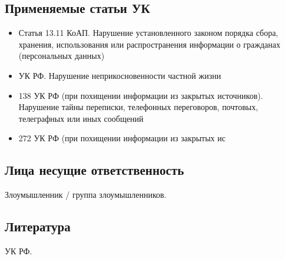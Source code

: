 \subsection*{Применяемые статьи УК}
\begin{itemize}
  \item Статья 13.11 КоАП. Нарушение установленного законом порядка сбора,
    хранения, использования или распространения информации о гражданах
    (персональных данных)
  \item УК РФ. Нарушение неприкосновенности частной жизни
  \item 138 УК РФ (при похищении информации из закрытых источников).  Нарушение
    тайны переписки, телефонных переговоров, почтовых, телеграфных или иных
    сообщений
  \item 272 УК РФ (при похищении информации из закрытых ис
\end{itemize}

\subsection*{Лица несущие ответственность}
Злоумышленник / группа злоумышленников.

\subsection*{Литература} УК РФ.
